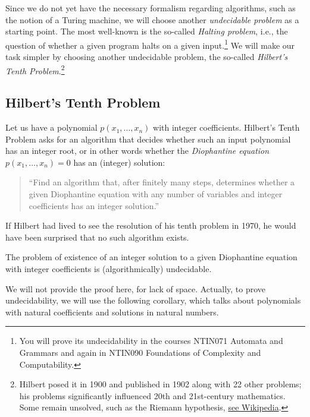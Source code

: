     Since we do not yet have the necessary formalism regarding algorithms, such as the notion of a Turing machine, we will choose another \emph{undecidable problem} as a starting point. The most well-known is the so-called \emph{Halting problem}, i.e., the question of whether a given program halts on a given input.\footnote{You will prove its undecidability in the courses NTIN071 Automata and Grammars and again in NTIN090 Foundations of Complexity and Computability.} We will make our task simpler by choosing another undecidable problem, the so-called \emph{Hilbert's Tenth Problem}.\footnote{Hilbert posed it in 1900 and published in 1902 along with 22 other problems; his problems significantly influenced 20th and 21st-century mathematics. Some remain unsolved, such as the Riemann hypothesis, \href{https://en.wikipedia.org/wiki/Riemann_hypothesis}{see Wikipedia}.}
    
    \subsection{Hilbert's Tenth Problem}
    
    Let us have a polynomial $p(x_1,\dots,x_n)$ with integer coefficients. Hilbert's Tenth Problem asks for an algorithm that decides whether such an input polynomial has an integer root, or in other words whether the \emph{Diophantine equation} $p(x_1,\dots,x_n)=0$ has an (integer) solution:
    \begin{quote}
        ``Find an algorithm that, after finitely many steps, determines whether a given Diophantine equation with any number of variables and integer coefficients has an integer solution.''
    \end{quote}
    
    If Hilbert had lived to see the resolution of his tenth problem in 1970, he would have been surprised that no such algorithm exists.
    
    \begin{theorem}
    The problem of existence of an integer solution to a given Diophantine equation with integer coefficients is (algorithmically) undecidable.
    \end{theorem}
    
    We will not provide the proof here, for lack of space. Actually, to prove undecidability, we will use the following corollary, which talks about polynomials with natural coefficients and solutions in natural numbers.
    
